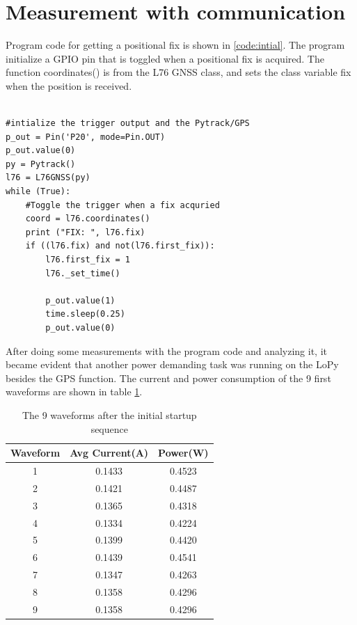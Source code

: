 \section{Measurement with communication}
Program code for getting a positional fix is shown in \ref{code:intial}. The program initialize a GPIO pin that is toggled when a positional fix is acquired. The function coordinates() is from the L76 GNSS class, and sets the class variable fix when the position is received. 
\lstset{language=Python}          %
\begin{lstlisting}[frame=single,caption = main.py]  % Start your code-block

#intialize the trigger output and the Pytrack/GPS
p_out = Pin('P20', mode=Pin.OUT)
p_out.value(0)
py = Pytrack()
l76 = L76GNSS(py)
while (True):
    #Toggle the trigger when a fix acquried
    coord = l76.coordinates()
    print ("FIX: ", l76.fix)
    if ((l76.fix) and not(l76.first_fix)):
        l76.first_fix = 1
        l76._set_time()

        p_out.value(1)
        time.sleep(0.25)
        p_out.value(0)
\end{lstlisting}
\label{code:intial}
After doing some measurements with the program code and analyzing it, it became evident that another power demanding task was running on the LoPy besides the GPS function. The current and power consumption of the 9 first waveforms are shown in table \ref{Table:WIFI_ON}.
\begin{table}[h!]
\begin{center}
 \begin{tabular}{||c c c||} 
 \hline
 Waveform & Avg Current(A) & Power(W)\\ [0.5ex] 
 \hline\hline
 1 & 0.1433    & 0.4523 \\ 
 \hline
 2 & 0.1421    & 0.4487 \\
 \hline
 3 & 0.1365  & 0.4318 \\
 \hline
 4 & 0.1334  & 0.4224 \\
 \hline
 5 & 0.1399  & 0.4420 \\ 
 \hline
 \rowcolor{red}
 6 & 0.1439    & 0.4541 \\ 
 \hline
 7 & 0.1347  & 0.4263 \\
 \hline
 8 & 0.1358  & 0.4296 \\
 \hline
 9 & 0.1358    & 0.4296 \\[1ex]
 \hline
\end{tabular}
\end{center}
\caption{The 9 waveforms after the initial startup sequence}
\label{Table:WIFI_ON}
\end{table}

